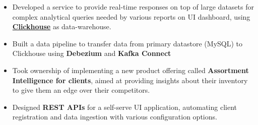\documentclass[a4paper]{MagicalCV}
\begin{document}
\begin{minipage}[t]{0.5\textwidth}
\begin{cventries}
{\begin{itemize}[leftmargin=6mm]
        \end{itemize}
        \vspace{4pt}
        \item \hspace{2pt} 
        \begin{itemize}[leftmargin=6mm]
            \item {Developed a service to provide real-time responses on top of large datasets for complex analytical queries needed by various reports on UI dashboard, using \href{https://clickhouse.com/}{\textbf{Clickhouse}} as data-warehouse.}
            \item {Built a data pipeline to transfer data from primary datastore (MySQL) to Clickhouse using \textbf{Debezium} and \textbf{Kafka Connect}}
        \end{itemize}
        \vspace{4pt}
        \item \hspace{2pt} 
        \begin{itemize}[leftmargin=6mm]
            \item {Took ownership of implementing a new product offering called \textbf{Assortment Intelligence for clients}, aimed at providing insights about their inventory to give them an edge over their competitors.}
            \item {Designed \textbf{REST APIs} for a self-serve UI application, automating client registration and data ingestion with various configuration options.}
        \end{itemize}
    }


\end{cventries}
\end{minipage}
\end{document}
